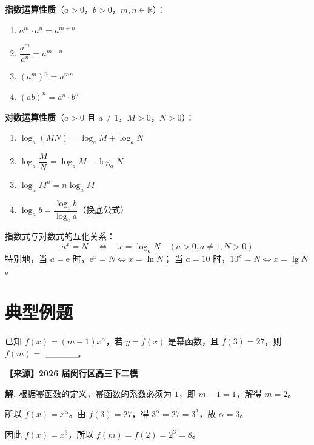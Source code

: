 \documentclass[11pt]{ctexrep}
\begin{document}
\begin{property}[运算性质]
    \textbf{指数运算性质}（$a > 0$，$b > 0$，$m, n \in \mathbb{R}$）：
    \begin{enumerate}
        \item $a^m \cdot a^n = a^{m+n}$
        \item $\dfrac{a^m}{a^n} = a^{m-n}$
        \item $(a^m)^n = a^{mn}$
        \item $(ab)^n = a^n \cdot b^n$
    \end{enumerate}

    \textbf{对数运算性质}（$a > 0$ 且 $a \neq 1$，$M > 0$，$N > 0$）：
    \begin{enumerate}
        \item $\log_a(MN) = \log_a M + \log_a N$
        \item $\log_a\dfrac{M}{N} = \log_a M - \log_a N$
        \item $\log_a M^n = n\log_a M$
        \item $\log_a b = \dfrac{\log_c b}{\log_c a}$（换底公式）
    \end{enumerate}
\end{property}

\begin{property}[指对互化]
    指数式与对数式的互化关系：
    \[
        a^x = N \quad \Longleftrightarrow \quad x = \log_a N \quad (a > 0, a \neq 1, N > 0)
    \]
    特别地，当 $a = \mathrm{e}$ 时，$\mathrm{e}^x = N \Leftrightarrow x = \ln N$；
    当 $a = 10$ 时，$10^x = N \Leftrightarrow x = \lg N$。
\end{property}

\section*{典型例题}

\begin{example}[幂函数的定义与性质]
    已知 $f(x) = (m-1)x^\alpha$，若 $y = f(x)$ 是幂函数，且 $f(3) = 27$，则 $f(m) =$ \_\_\_\_\_。
    
    \textbf{【来源】2026 届闵行区高三下二模}
\end{example}

\textbf{解.} 根据幂函数的定义，幂函数的系数必须为 $1$，即 $m - 1 = 1$，解得 $m = 2$。

所以 $f(x) = x^\alpha$。由 $f(3) = 27$，得 $3^\alpha = 27 = 3^3$，故 $\alpha = 3$。

因此 $f(x) = x^3$，所以 $f(m) = f(2) = 2^3 = 8$。
\end{document}
